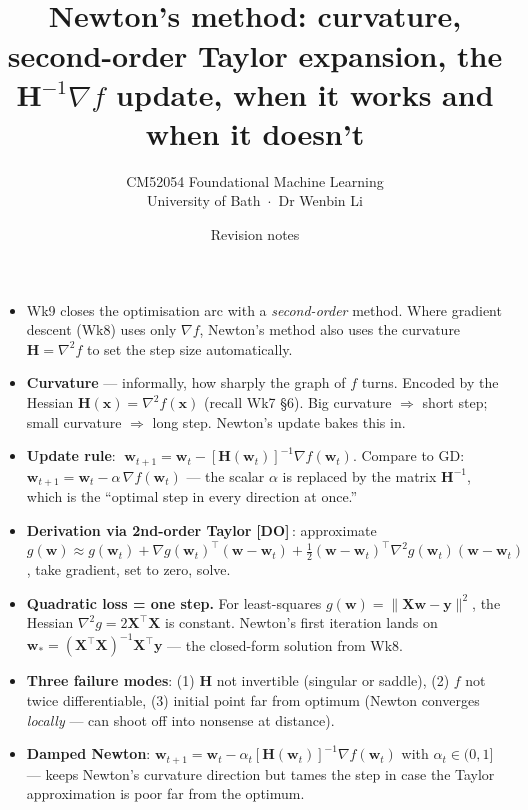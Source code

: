\documentclass[11pt, a4paper]{article}
\title{\vspace{-1cm}{\Huge\bfseries Week 9 — Optimisation Basics 3} \\[0.4em]{\large Newton's method: curvature, second-order Taylor expansion, the $\mathbf{H}^{-1}\nabla f$ update, when it works and when it doesn't}}
\author{\large CM52054 Foundational Machine Learning \\[0.2em]\normalsize University of Bath \,$\cdot$\, Dr Wenbin Li}
\date{Revision notes}
\newcommand{\doflag}{\textcolor{defBd}{\textbf{[DO]}}\,}
\begin{document}
\maketitle
\thispagestyle{empty}

\vspace{1em}

\begin{tldrbox}
\begin{itemize}[leftmargin=*]
  \item Wk9 closes the optimisation arc with a \emph{second-order} method. Where gradient descent (Wk8) uses only $\nabla f$, Newton's method also uses the curvature $\mathbf{H} = \nabla^2 f$ to set the step size automatically.
  \item \textbf{Curvature} — informally, how sharply the graph of $f$ turns. Encoded by the Hessian $\mathbf{H}(\mathbf{x}) = \nabla^2 f(\mathbf{x})$ (recall Wk7 §6). Big curvature $\Rightarrow$ short step; small curvature $\Rightarrow$ long step. Newton's update bakes this in.
  \item \textbf{Update rule}: $\;\mathbf{w}_{t+1} = \mathbf{w}_t - [\mathbf{H}(\mathbf{w}_t)]^{-1}\nabla f(\mathbf{w}_t)$. Compare to GD: $\mathbf{w}_{t+1} = \mathbf{w}_t - \alpha\,\nabla f(\mathbf{w}_t)$ — the scalar $\alpha$ is replaced by the matrix $\mathbf{H}^{-1}$, which is the ``optimal step in every direction at once.''
  \item \textbf{Derivation via 2nd-order Taylor} \doflag{}: approximate $g(\mathbf{w}) \approx g(\mathbf{w}_t) + \nabla g(\mathbf{w}_t)^\top(\mathbf{w}-\mathbf{w}_t) + \tfrac{1}{2}(\mathbf{w}-\mathbf{w}_t)^\top\nabla^2 g(\mathbf{w}_t)(\mathbf{w}-\mathbf{w}_t)$, take gradient, set to zero, solve.
  \item \textbf{Quadratic loss = one step.} For least-squares $g(\mathbf{w}) = \|\mathbf{X}\mathbf{w}-\mathbf{y}\|^2$, the Hessian $\nabla^2 g = 2\mathbf{X}^\top\mathbf{X}$ is constant. Newton's first iteration lands on $\mathbf{w}_* = (\mathbf{X}^\top\mathbf{X})^{-1}\mathbf{X}^\top\mathbf{y}$ — the closed-form solution from Wk8.
  \item \textbf{Three failure modes}: (1) $\mathbf{H}$ not invertible (singular or saddle), (2) $f$ not twice differentiable, (3) initial point far from optimum (Newton converges \emph{locally} — can shoot off into nonsense at distance).
  \item \textbf{Damped Newton}: $\mathbf{w}_{t+1} = \mathbf{w}_t - \alpha_t [\mathbf{H}(\mathbf{w}_t)]^{-1}\nabla f(\mathbf{w}_t)$ with $\alpha_t \in (0,1]$ — keeps Newton's curvature direction but tames the step in case the Taylor approximation is poor far from the optimum.

\end{itemize}
\end{tldrbox}
\end{document}
